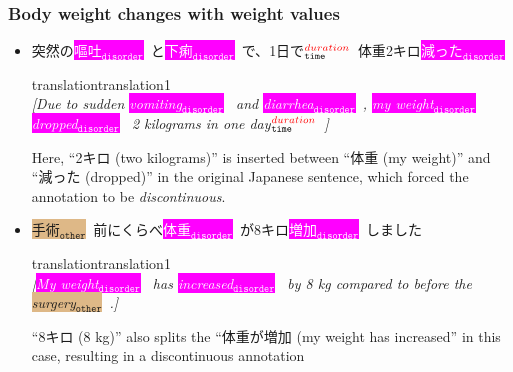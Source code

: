 \documentclass[12pt]{article}
\theoremstyle{definition}
\newcommand{\disorder}[1]{\colorbox{fuchsia}{\textcolor{white}{#1$_{\texttt{disorder}}$}}\ }
\newcommand{\timexDur}[2]{\colorbox{ashgrey}{#1$_{\texttt{time}}^{\textcolor{red}{duration}}$}\ }
\newcommand{\other}[1]{\colorbox{burlywood}{#1$_{\texttt{other}}$}\ }
\newcommand{\translation}[1]{\begin{ocg}{translation}{translation}{1}\footnotesize{\\\textit{[#1]}}\end{ocg}}
\begin{document}
\subsubsection{Body weight changes with weight values}

\begin{itemize}
    \item 突然の\disorder{嘔吐}と\disorder{下痢}で、\timexDur{1日で}\disorder{体重}2キロ\disorder{減った}
        \translation{Due to sudden \disorder{vomiting} and \disorder{diarrhea}, \disorder{my weight} \disorder{dropped} 2 kilograms \timexDur{in one day}.}

        Here, ``2キロ (two kilograms)'' is inserted between ``体重 (my weight)'' and ``減った (dropped)'' in the original Japanese sentence, which forced the annotation to be \textit{discontinuous}.

    \item \other{手術}前にくらべ\disorder{体重}が8キロ\disorder{増加}しました
        \translation{\disorder{My weight} has \disorder{increased} by 8 kg compared to before the \other{surgery}.}

        ``8キロ (8 kg)'' also splits the ``体重が増加 (my weight has increased'' in this case, resulting in a discontinuous annotation
\end{itemize}
\end{document}
